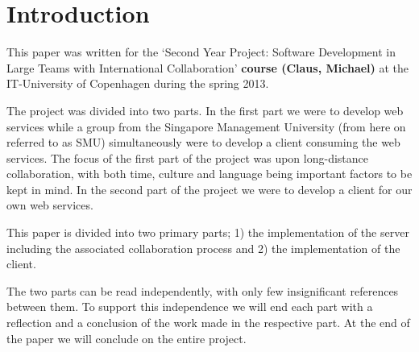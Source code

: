 \section{Introduction}
This paper was written for the `Second Year Project: Software Development in Large Teams with International Collaboration' \textbf{course (Claus, Michael)} at the IT-University of Copenhagen during the spring 2013.

The project was divided into two parts. In the first part we were to develop web services while a group from the Singapore Management University (from here on referred to as SMU) simultaneously were to develop a client consuming the web services.
The focus of the first part of the project was upon long-distance collaboration, with both time, culture and language being important factors to be kept in mind.
In the second part of the project we were to develop a client for our own web services.

This paper is divided into two primary parts; 1) the implementation of the server including the associated collaboration process and 2) the implementation of the client. 

The two parts can be read independently, with only few insignificant references between them. To support this independence we will end each part with a reflection and a conclusion of the work made in the respective part.
At the end of the paper we will conclude on the entire project.
\newpage